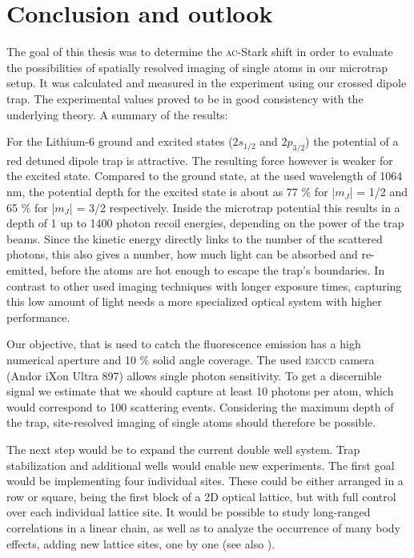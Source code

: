 \chapter{Conclusion and outlook}

The goal of this thesis was to determine the \textsc{ac}-Stark shift in order to evaluate the possibilities of spatially resolved imaging of single atoms in our microtrap setup. It was calculated and measured in the experiment using our crossed dipole trap. The experimental values proved to be in good consistency with the underlying theory. A summary of the results:

For the Lithium-6 ground and excited states ($2s_{1/2}$ and $2p_{3/2}$) the potential of a red detuned dipole trap is attractive. The resulting force however is weaker for the excited state. Compared to the ground state, at the used wavelength of 1064 nm, the potential depth for the excited state is  about as 77 \% for |$m_J$| = 1/2 and 65 \% for |$m_J$| = 3/2 respectively. Inside the microtrap potential this results in a depth of 1 up to 1400 photon recoil energies, depending on the power of the trap beams. Since the kinetic energy directly links to the number of the scattered photons, this also gives a number, how much light can be absorbed and re-emitted, before the atoms are hot enough to escape the trap's boundaries. In contrast to other used imaging techniques with longer exposure times, capturing this low amount of light needs a more specialized optical system with higher performance.

Our objective, that is used to catch the fluorescence emission has a high numerical aperture and 10 \% solid angle coverage. The used \textsc{emccd} camera (Andor iXon Ultra 897) allows single photon sensitivity. To get a discernible signal we estimate that we should capture at least 10 photons per atom, which would correspond to 100 scattering events. Considering the maximum depth of the trap, site-resolved imaging of single atoms should therefore be possible.

The next step would be to expand the current double well system. Trap stabilization and additional wells would enable new experiments. The first goal would be implementing four individual sites. These could be either arranged in a row or square, being the first block of a 2D optical lattice, but with full control over each individual lattice site. It would be possible to study long-ranged correlations in a linear chain, as well as to analyze the occurrence of many body effects, adding new lattice sites, one by one (see also \cite{dwave}). 





